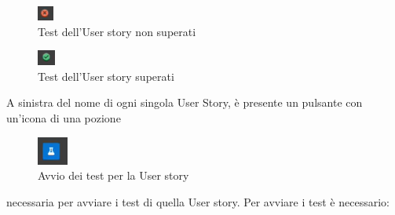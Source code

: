 \documentclass{article}
\begin{document}
    \begin{figure}[H]
      \centering
      \includegraphics{documenti/Screenshot manuale utente/croce.png}
      \caption{Test dell'User story non superati}
      \label{testnonsup}
      \end{figure}
    \hfill
    \begin{figure}[H]
      \centering
      \includegraphics{documenti/Screenshot manuale utente/tic.png}
      \caption{Test dell'User story superati}
      \label{testsup}
    \end{figure}


A sinistra del nome di ogni singola User Story, è presente un pulsante con un'icona di una pozione
    \begin{figure}[H]
      \centering
      \includegraphics{documenti/Screenshot manuale utente/pozione.png}
      \caption{Avvio dei test per la User story}
      \label{testus}
    \end{figure}
necessaria per avviare i test di quella User story. Per avviare i test è necessario:
\end{document}
